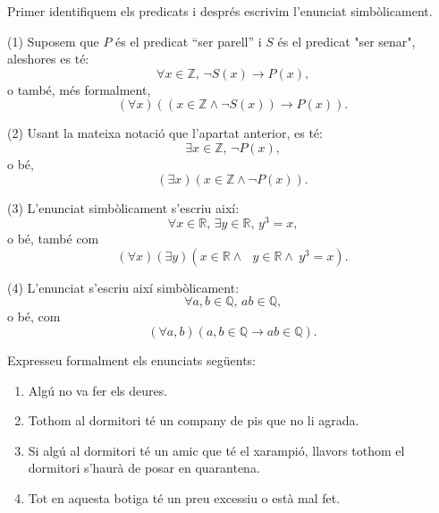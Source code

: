\begin{solucio}
Primer identifiquem els predicats i després escrivim l'enunciat simbòlicament.

(1) Suposem que $P$ és el predicat \enquote{ser parell} i $S$ és el predicat
"ser senar", aleshores es té:%
\[
\forall x\in\mathbb{Z}\text{, }\lnot S(x)\longrightarrow P(x)\text{,}%
\]
o també, més formalment,
\[
\left(  \forall x\right)  \left(  \left(  x\in\mathbb{Z}\wedge\lnot
S(x)\right)  \longrightarrow P\left(  x\right)  \right)  \text{.}%
\]


(2) Usant la mateixa notació que l'apartat anterior, es té:%
\[
\exists x\in\mathbb{Z}\text{, }\lnot P\left(  x\right)  \text{,}%
\]
o bé,%
\[
\left(  \exists x\right)  \left(  x\in\mathbb{Z\wedge}\lnot P\left(  x\right)
\right)  \text{.}%
\]


(3) L'enunciat simbòlicament s'escriu així:%
\[
\forall x\in\mathbb{R}\text{, }\exists y\in\mathbb{R}\text{, }y^{3}=x\text{,}%
\]
o bé, també com%
\[
\left(  \forall x\right)  \left(  \exists y\right)  \left(  x\in
\mathbb{R\wedge}\text{ }y\in\mathbb{R\wedge~}y^{3}=x\right)  \text{.}%
\]


(4) L'enunciat s'escriu així simbòlicament:%
\[
\forall a,b\in\mathbb{Q}\text{, }ab\in\mathbb{Q}\text{,}%
\]
o bé, com%
\[
\left(  \forall a,b\right)  \left(  a,b\in\mathbb{Q}\longrightarrow
ab\in\mathbb{Q}\right)  \text{.}%
\]

\end{solucio}

\begin{exercici}
Expresseu formalment els enunciats següents:

\begin{enumerate}
\item Algú no va fer els deures.

\item Tothom al dormitori té un company de pis que no li agrada.

\item Si algú al dormitori té un amic que té el xarampió,
llavors tothom el dormitori s'haurà de posar en quarantena.

\item Tot en aquesta botiga té un preu excessiu o està mal fet.
\end{enumerate}
\end{exercici}

